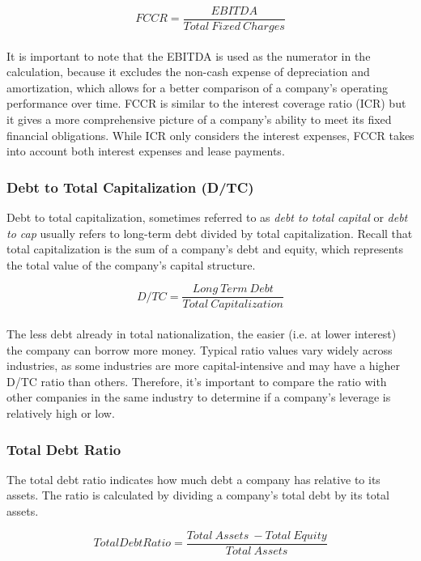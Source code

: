 \documentclass{article}
\begin{document}
 \begin{equation}
    FCCR = \frac{EBITDA}{Total\: Fixed\: Charges}
\end{equation}\\

It is important to note that the EBITDA is used as the numerator in the calculation, because it excludes the non-cash expense of depreciation and amortization, which allows for a better comparison of a company's operating performance over time. FCCR is similar to the interest coverage ratio (ICR) but it gives a more comprehensive picture of a company's ability to meet its fixed financial obligations. While ICR only considers the interest expenses, FCCR takes into account both interest expenses and lease payments.


\subsubsection{Debt to Total Capitalization (D/TC)}
Debt to total capitalization, sometimes referred to as \textit{debt to total capital} or \textit{debt to cap} usually refers to long-term debt divided by total capitalization. Recall that total capitalization is the sum of a company's debt and equity, which represents the total value of the company's capital structure.

 \begin{equation}
    D/TC = \frac{Long\: Term\: Debt}{Total\: Capitalization}
\end{equation}\\

The less debt already in total nationalization, the easier (i.e. at lower interest) the company can borrow more money. Typical ratio values vary widely across industries, as some industries are more capital-intensive and may have a higher D/TC ratio than others. Therefore, it's important to compare the ratio with other companies in the same industry to determine if a company's leverage is relatively high or low.

\subsubsection{Total Debt Ratio}
The total debt ratio indicates how much debt a company has relative to its assets. The ratio is calculated by dividing a company's total debt by its total assets. 

 \begin{equation}
    Total Debt Ratio = \frac{Total\: Assets\: - Total\: Equity}{Total\: Assets}
\end{equation}\\
\end{document}
